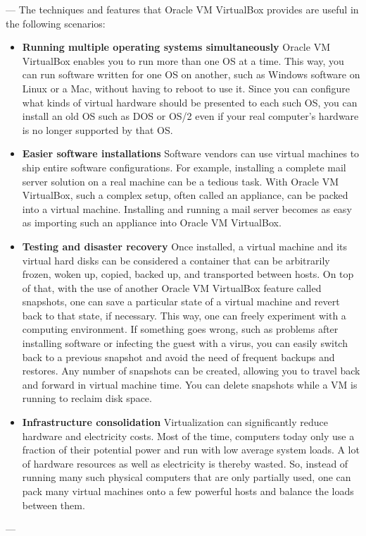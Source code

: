 \documentclass[11pt]{article}
\begin{document}
---
 The techniques and features that Oracle VM VirtualBox provides are useful
 in the following scenarios:

\begin{itemize}
\item \textbf{Running multiple operating systems simultaneously}
Oracle VM VirtualBox enables you to run more than one OS at a time. This way, you can run software written for one OS on another, such as Windows software on Linux or a Mac, without having to reboot to use it. Since you can configure what kinds of virtual hardware should be presented to each such OS, you can install an old OS such as DOS or OS/2 even if your real computer's hardware is no longer supported by that OS.
\item \textbf{Easier software installations} 
Software vendors can use virtual machines to ship entire software configurations. For example, installing a complete mail server solution on a real machine can be a tedious task. With Oracle VM VirtualBox, such a complex setup, often called an appliance, can be packed into a virtual machine. Installing and running a mail server becomes as easy as importing such an appliance into Oracle VM VirtualBox.
\item \textbf{Testing and disaster recovery} 
Once installed, a virtual machine and its virtual hard disks can be considered a container that can be arbitrarily frozen, woken up, copied, backed up, and transported between hosts.
On top of that, with the use of another Oracle VM VirtualBox feature called snapshots, one can save a particular state of a virtual machine and revert back to that state, if necessary. This way, one can freely experiment with a computing environment. If something goes wrong, such as problems after installing software or infecting the guest with a virus, you can easily switch back to a previous snapshot and avoid the need of frequent backups and restores.
Any number of snapshots can be created, allowing you to travel back and forward in virtual machine time. You can delete snapshots while a VM is running to reclaim disk space.
\item \textbf{Infrastructure consolidation}
Virtualization can significantly reduce hardware and electricity costs. Most of the time, computers today only use a fraction of their potential power and run with low average system loads. A lot of hardware resources as well as electricity is thereby wasted. So, instead of running many such physical computers that are only partially used, one can pack many virtual machines onto a few powerful hosts and balance the loads between them.
\end{itemize}
---
\newpage
\end{document}
